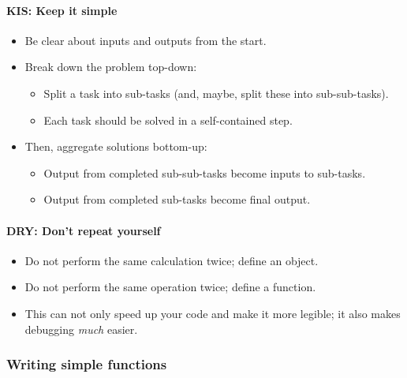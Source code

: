 \documentclass[
  11pt,
]{article}
\providecommand{\tightlist}{%
  \setlength{\itemsep}{0pt}\setlength{\parskip}{0pt}}
\begin{document}
\hypertarget{kis-keep-it-simple}{%
\paragraph{KIS: Keep it simple}\label{kis-keep-it-simple}}

\begin{itemize}
\tightlist
\item
  Be clear about inputs and outputs from the start.
\item
  Break down the problem top-down:

  \begin{itemize}
  \tightlist
  \item
    Split a task into sub-tasks (and, maybe, split these into sub-sub-tasks).
  \item
    Each task should be solved in a self-contained step.
  \end{itemize}
\item
  Then, aggregate solutions bottom-up:

  \begin{itemize}
  \tightlist
  \item
    Output from completed sub-sub-tasks become inputs to sub-tasks.
  \item
    Output from completed sub-tasks become final output.
  \end{itemize}
\end{itemize}

\hypertarget{dry-dont-repeat-yourself}{%
\paragraph{DRY: Don't repeat yourself}\label{dry-dont-repeat-yourself}}

\begin{itemize}
\tightlist
\item
  Do not perform the same calculation twice; define an object.
\item
  Do not perform the same operation twice; define a function.
\item
  This can not only speed up your code and make it more legible; it also makes debugging \emph{much} easier.
\end{itemize}

\hypertarget{writing-simple-functions}{%
\subsubsection{Writing simple functions}\label{writing-simple-functions}}
\end{document}
